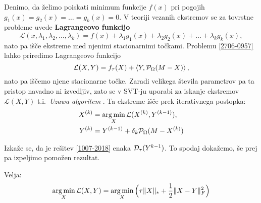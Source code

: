Denimo, da želimo poiskati minimum funkcije $f(x)$ pri pogojih $g_1(x)=g_2(x)=\ldots=g_{k}(x)=0$.
V teoriji vezanih ekstremov se za tovrstne probleme uvede \textbf{Lagrangeovo funkcijo}
\[\mathcal{L}(x, \lambda_1,\lambda_2,\ldots,\lambda_k) = f(x) + \lambda_1 g_1(x)+\lambda_2g_2(x)+\ldots+\lambda_kg_k(x),\]
nato pa išče ekstreme med njenimi stacionarnimi točkami.
Problemu \eqref{2706-0957} lahko priredimo Lagrangeovo funkcijo
\[
    \mathcal{L}(X, Y) = f_\tau(X) + \left< Y, \mathcal{P}_\Omega(M - X) \right>,
\] 
nato pa iščemo njene stacionarne točke.
Zaradi velikega števila parametrov pa ta pristop navadno ni izvedljiv, zato se v SVT-ju uporabi za iskanje ekstremov $\mathcal{L}(X, Y)$ t.i.\ \textit{Uzawa algoritem} \cite{CCS}. Ta ekstreme išče prek iterativnega postopka:
\begin{align}
        X^{(k)} &=  \operatorname*{arg\,min}_{X} \mathcal{L}(X^{(k)}, Y^{(k-1)}) \label{1007-2018},\\
        Y^{(k)} &= Y^{(k-1)} + \delta_k \mathcal{P}_\Omega(M - X^{(k)}) \label{1007-2019}
\end{align}


Izkaže se, da je rešitev \eqref{1007-2018} enaka $\mathcal{D}_\tau(Y^{k-1})$. To spodaj dokažemo, še prej pa izpeljimo pomožen rezultat.

\begin{trditev}
Velja:
\begin{align}
    \operatorname*{arg\,min}_X  \mathcal{L}(X, Y)
    = \operatorname*{arg\,min}_X \Big(\tau\lVert X\rVert_* + \frac{1}{2}\lVert X - Y\rVert_F^2\Big)
\end{align}
\end{trditev}

